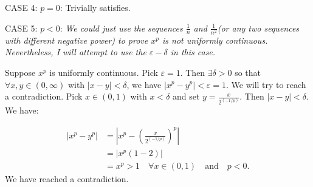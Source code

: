 \begin{numedquestion}
CASE 4: $p=0$: Trivially satisfies. 

CASE 5: $p<0$: \emph{We could just use the sequences $\frac{1}{n}$ and $\frac{1}{n^2}$(or any two sequences with different negative power) to prove $x^p$ is not uniformly continuous. Nevertheless, I will attempt to use the $\varepsilon-\delta$ in this case. } 

Suppose $x^p$ is uniformly continuous. Pick $\varepsilon=1$. 
Then $\exists \delta >0$ so that $\forall x,y \in (0,\infty)$ with $|x-y| < \delta$, we have $|x^p - y^p| < \varepsilon =1$. We will try to reach a contradiction. \newline
Pick $x \in (0,1)$ with $x < \delta$ and set $y=\frac{x}{2^{(-1/p)}}$. Then $|x-y|  < \delta $. We have:

\begin{align*}
  |x^p - y^p| & = \left|x^p - \left(\frac{x}{2^{(-1/p)}}\right)^p\right| \\
  & = \left| x^{p}\left(1-2 \right)\right|\\
  & =  x^{p} > 1 \quad \forall x \in (0,1) \quad  \text{and} \quad p<0.
\end{align*}
We have reached a contradiction.



\end{numedquestion}






  
